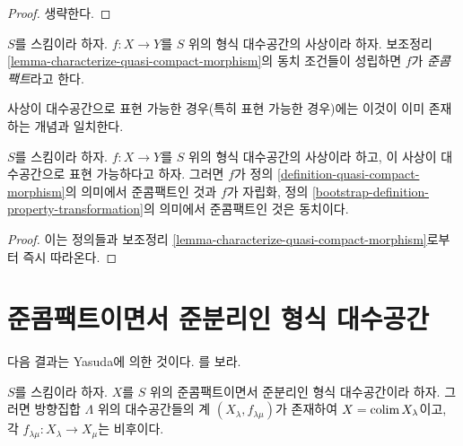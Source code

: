 \begin{proof}
생략한다.
\end{proof}

\begin{definition}
\label{definition-quasi-compact-morphism}
$S$를 스킴이라 하자. $f : X \to Y$를 $S$ 위의 형식
대수공간의 사상이라 하자. 보조정리
\ref{lemma-characterize-quasi-compact-morphism}의 동치 조건들이
성립하면 $f$가 {\it 준콤팩트}라고 한다.
\end{definition}

\noindent
사상이 대수공간으로 표현 가능한 경우(특히 표현 가능한 경우)에는
이것이 이미 존재하는 개념과 일치한다.

\begin{lemma}
\label{lemma-quasi-compact-representable}
$S$를 스킴이라 하자. $f : X \to Y$를 $S$ 위의 형식
대수공간의 사상이라 하고, 이 사상이 대수공간으로 표현 가능하다고
하자. 그러면 $f$가 정의
\ref{definition-quasi-compact-morphism}의 의미에서 준콤팩트인 것과
$f$가 자립화, 정의 \ref{bootstrap-definition-property-transformation}의
의미에서 준콤팩트인 것은 동치이다.
\end{lemma}

\begin{proof}
이는 정의들과 보조정리
\ref{lemma-characterize-quasi-compact-morphism}로부터 즉시 따라온다.
\end{proof}

\section{준콤팩트이면서 준분리인 형식 대수공간}
\label{section-quasi-compact-quasi-separated}

\noindent
다음 결과는 Yasuda에 의한 것이다. \cite[Proposition 3.32]{Yasuda}를
보라.

\begin{lemma}
\label{lemma-structure-quasi-compact-quasi-separated}
\begin{reference}
\cite[Proposition 3.32]{Yasuda}
\end{reference}
$S$를 스킴이라 하자. $X$를 $S$ 위의 준콤팩트이면서 준분리인
형식 대수공간이라 하자. 그러면 방향집합 $\Lambda$ 위의
대수공간들의 계 $(X_\lambda, f_{\lambda \mu})$가 존재하여
$X = \mathop{\mathrm{colim}}\nolimits X_\lambda$이고, 각
$f_{\lambda \mu} : X_\lambda \to X_\mu$는 비후이다.
\end{lemma}

